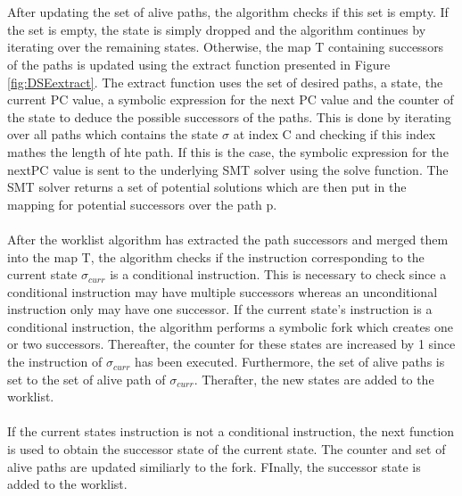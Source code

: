 \documentclass{kththesis}
\begin{document}
\\ \\
After updating the set of alive paths, the algorithm checks if this set is empty. If the set is empty, the state is simply dropped and the algorithm continues by iterating over the remaining states. Otherwise, the map T containing successors of the paths is updated using the extract function presented in Figure \ref{fig:DSEextract}. The extract function uses the set of desired paths, a state, the current PC value, a symbolic expression for the next PC value and the counter of the state to deduce the possible successors of the paths. This is done by iterating over all paths which contains the state $\sigma$ at index C and checking if this index mathes the length of hte path. If this is the case, the symbolic expression for the nextPC value is sent to the underlying SMT solver using the solve function. The SMT solver returns a set of potential solutions which are then put in the mapping for potential successors over the path p.
\\ \\
After the worklist algorithm has extracted the path successors and merged them into the map T, the algorithm checks if the instruction corresponding to the current state $\sigma_{curr}$ is a conditional instruction. This is necessary to check since a conditional instruction may have multiple successors whereas an unconditional instruction only may have one successor. If the current state's instruction is a conditional instruction, the algorithm performs a symbolic fork which creates one or two successors. Thereafter, the counter for these states are increased by 1 since the instruction of $\sigma_{curr}$ has been executed. Furthermore, the set of alive paths is set to the set of alive path of $\sigma_{curr}$. Therafter, the new states are added to the worklist.
\\ \\
If the current states instruction is not a conditional instruction, the next function is used to obtain the successor state of the current state. The counter and set of alive paths are updated similiarly to the fork. FInally, the successor state is added to the worklist.
\end{document}
